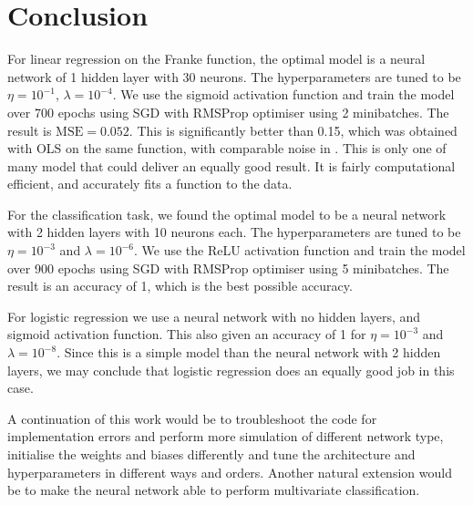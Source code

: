 \section{Conclusion}\label{sec:conclusion}

For linear regression on the Franke function, the optimal model is a neural network of 1 hidden layer with 30 neurons. The hyperparameters are tuned to be $\eta=10^{-1}$, $\lambda=10^{-4}$. We use the sigmoid activation function and train the model over 700 epochs using SGD with RMSProp optimiser using 2 minibatches. The result is $\mathrm{MSE} = 0.052$. This is significantly better than 0.15, which was obtained with OLS on the same function, with comparable noise in \projectOne. This is only one of many model that could deliver an equally good result. It is fairly computational efficient, and accurately fits a function to the data. 

For the classification task, we found the optimal model to be a neural network with 2 hidden layers with 10 neurons each. The hyperparameters are tuned to be $\eta=10^{-3}$ and $\lambda=10^{-6}$. We use the ReLU activation function and train the model over 900 epochs using SGD with RMSProp optimiser using 5 minibatches. The result is an accuracy of 1, which is the best possible accuracy. 

For logistic regression we use a neural network with no hidden layers, and sigmoid activation function. This also given an accuracy of 1 for $\eta=10^{-3}$ and $\lambda=10^{-8}$. Since this is a simple model than the neural network with 2 hidden layers, we may conclude that logistic regression does an equally good job in this case. 

A continuation of this work would be to troubleshoot the code for implementation errors and perform more simulation of different network type, initialise the weights and biases differently and tune the architecture and hyperparameters in different ways and orders. Another natural extension would be to make the neural network able to perform multivariate classification. 